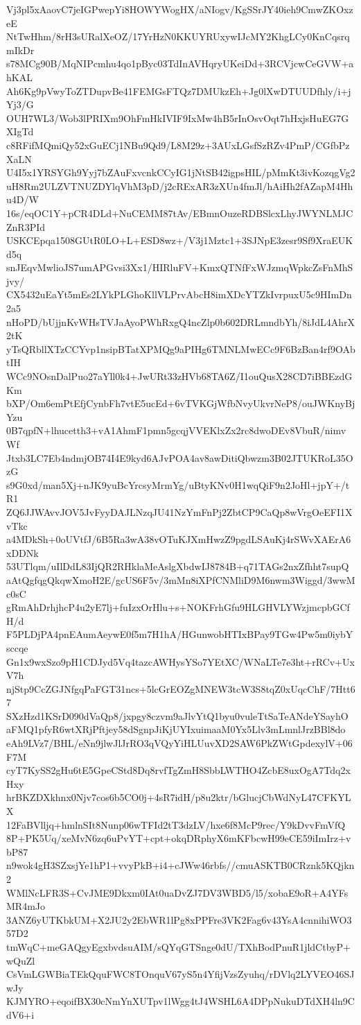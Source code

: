 Vj3pl5xAaovC7jeIGPwepYi8HOWYWogHX/aNIogv/KgSSrJY40ieh9CmwZKOxzeE
NtTwHhm/8rH3sURalXeOZ/17YrHzN0KKUYRUxywIJcMY2KhgLCy0KnCqsrqmIkDr
s78MCg90B/MqNIPcmhu4qo1pByc03TdInAVHqryUKeiDd+3RCVjcwCeGVW+ahKAL
Ah6Kg9pVwyToZTDupvBe41FEMGsFTQz7DMUkzEh+Jg0lXwDTUUDfhly/i+jYj3/G
OUH7WL3/Wob3lPRIXm9OhFmHkIVIF9IxMw4hB5rInOsvOqt7hHxjsHuEG7GXIgTd
c8RFifMQmiQy52xGuECj1NBu9Qd9/L8M29z+3AUxLGsfSzRZv4PmP/CGfbPzXaLN
U4I5x1YRSYGh9Yyj7bZAuFxvcnkCCyIG1jNtSB42igpsHIL/pMmKt3ivKozqgVg2
uH8Rm2ULZVTNUZDYlqVhM3pD/j2cRExAR3zXUn4fmJl/hAiHh2fAZapM4Hhu4D/W
16s/eqOC1Y+pCR4DLd+NuCEMM87tAv/EBmnOuzeRDBSlcxLhyJWYNLMJCZnR3PId
USKCEpqa1508GUtR0LO+L+ESD8wz+/V3j1Mztc1+3SJNpE3zesr9Sf9XraEUKd5q
snJEqvMwlioJS7umAPGvsi3Xx1/HIRluFV+KmxQTNfFxWJzmqWpkcZsFnMhSjvy/
CX5432uEaYt5mEs2LYkPLGhoKllVLPrvAbcH8imXDcYTZkIvrpuxU5c9HImDn2a5
nHoPD/bUjjnKvWHsTVJaAyoPWhRxgQ4ncZlp0b602DRLmndbYh/8iJdL4AhrX2tK
yTsQRbllXTzCCYvp1nsipBTatXPMQg9aPIHg6TMNLMwECc9F6BzBan4rf9OAbtIH
WCc9NOsnDalPuo27aYll0k4+JwURt33zHVb68TA6Z/I1ouQusX28CD7iBBEzdGKm
bXP/Om6emPtEfjCynbFh7vtE5ucEd+6vTVKGjWfbNvyUkvrNeP8/ouJWKnyBjYzu
0B7qpfN+lhucetth3+vA1AhmF1pmn5gcqjVVEKlxZx2rc8dwoDEv8VbuR/nimvWf
Jtxb3LC7Eb4ndmjOB74I4E9kyd6AJvPOA4av8awDitiQbwzm3B02JTUKRoL35OzG
s9G0xd/man5Xj+nJK9yuBcYrcsyMrmYg/uBtyKNv0H1wqQiF9n2JoHl+jpY+/tR1
ZQ6JJWAvvJOV5JvFyyDAJLNzqJU41NzYmFnPj2ZbtCP9CaQp8wVrgOeEFI1XvTkc
a4MDkSh+0oUVtfJ/6B5Ra3wA38vOTuKJXmHwzZ9pgdLSAuKj4rSWvXAErA6xDDNk
53UTlqm/uIlDdL83IjQR2RHklaMeAslgXbdwIJ8784B+q71TAGs2nxZfhht7supQ
aAtQgfqgQkqwXmoH2E/gcUS6F5v/3mMn8iXPfCNMliD9M6nwm3Wiggd/3wwMc0sC
gRmAhDrhjhcP4u2yE7lj+fuIzxOrHlu+s+NOKFrhGfu9HLGHVLYWzjmcpbGCfH/d
F5PLDjPA4pnEAumAeywE0f5m7H1hA/HGunwobHTIxBPay9TGw4Pw5m0iybYsccqe
Gn1x9wxSzo9pH1CDJyd5Vq4tazcAWHysYSo7YEtXC/WNaLTe7e3ht+rRCv+UxV7h
njStp9CcZGJNfgqPaFGT31ncs+5lcGrEOZgMNEW3tcW3S8tqZ0xUqcChF/7Htt67
SXzHzd1KSrD090dVaQp8/jxpgy8czvm9aJlvYtQ1byu0vuleTtSaTeANdeYSayhO
aFMQ1pfyR6wtXRjPftjey58dSgnpJiKjUYIxuimaaM0Yx5Llv3mLmnlJrzBBl8do
eAh9LVz7/BHL/eNn9jlwJlJrRO3qVQyYiHLUuvXD2SAW6PkZWtGpdexylV+06F7M
cyT7KySS2gHu6tE5GpeCStd8Dq8rvfTgZmH8SbbLWTHO4ZcbE8uxOgA7Tdq2xHxy
hrBKZDXkhnx0Njv7cos6b5CO0j+4sR7idH/p8u2ktr/bGlucjCbWdNyL47CFKYLX
12FaBVlljq+hmlnSIt8Nunp06wTFId2tT3dzLV/hxe6f8McP9rec/Y9kDvvFmVfQ
8P+PK5Uq/xeMvN6zq6uPvYT+cpt+okqDRphyX6mKFbcwH99eCE59iImIrz+vbP87
n9wok4gH3SZxsjYe1hP1+vvyPkB+i4+cJWw46rbfs//cmuASKTB0CRznk5KQjkn2
WMlNcLFR3S+CvJME9Dkxm0IAt0uaDvZJ7DV3WBD5/l5/xobaE9oR+A4YFsMR4mJo
3ANZ6yUTKbkUM+X2JU2y2EbWR1lPg8xPPFre3VK2Fag6v43YsA4cnnihiWO357D2
tmWqC+meGAQgyEgxbvdsuAIM/sQYqGTSnge0dU/TXhBodPnuR1jldCtbyP+wQuZl
CsVmLGWBiaTEkQquFWC8TOnquV67yS5n4YfijVzsZyuhq/rDVlq2LYVEO46SJwJy
KJMYRO+eqoifBX30cNmYnXUTpv1lWgg4tJ4WSHL6A4DPpNukuDTdXH4ln9CdV6+i
